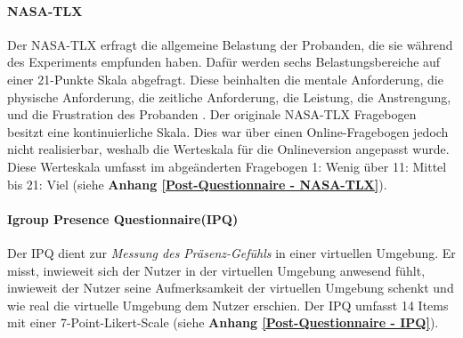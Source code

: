 \documentclass[a4paper,11pt]{article}%
\renewcommand{\\}{\vspace*{0.5\baselineskip} \newline}
\begin{document}
		\paragraph{NASA-TLX}
Der NASA-TLX erfragt die allgemeine Belastung der Probanden, die sie während des Experiments empfunden haben. Dafür werden sechs Belastungsbereiche auf einer 21-Punkte Skala abgefragt. Diese beinhalten die mentale Anforderung, die physische Anforderung, die zeitliche Anforderung, die Leistung, die Anstrengung, und die Frustration des Probanden \citep{NASATLX}.
Der originale NASA-TLX Fragebogen besitzt eine kontinuierliche Skala. Dies war über einen Online-Fragebogen jedoch nicht realisierbar, weshalb die Werteskala für die Onlineversion angepasst wurde. Diese Werteskala umfasst im abgeänderten Fragebogen 1: \glqq{}Wenig\dq{} über 11: \glqq{}Mittel\dq{} bis 21: \glqq{}Viel\dq{} (siehe \textbf{Anhang \ref{Post-Questionnaire - NASA-TLX}}).

		\paragraph{Igroup Presence Questionnaire(IPQ)}
Der IPQ dient zur \textit{Messung des Präsenz-Gefühls} in einer virtuellen Umgebung. Er misst, inwieweit sich der Nutzer in der virtuellen Umgebung anwesend fühlt, inwieweit der Nutzer seine Aufmerksamkeit der virtuellen Umgebung schenkt und wie real die virtuelle Umgebung dem Nutzer erschien. Der IPQ umfasst 14 Items mit einer 7-Point-Likert-Scale (siehe \textbf{Anhang \ref{Post-Questionnaire - IPQ}}).
		
\end{document}
